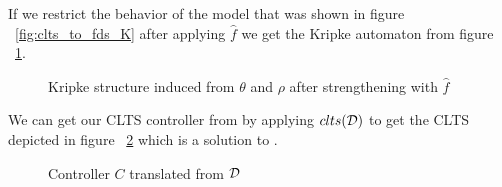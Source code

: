 If we restrict the behavior of the model that was shown in figure ~\ref{fig:clts_to_fds_K} after applying $\hat{f}$ we get the Kripke automaton from figure  ~\ref{fig:clts_to_fds_F}.

\begin{figure}[bt]
	\centering
	\caption{Kripke structure induced from $\theta$ and $\rho$ after strengthening with $\hat{f}$}
	\label{fig:clts_to_fds_F}
\end{figure}

We can get our CLTS controller from \fdsD by applying $clts(\mathcal{D})$ to get the CLTS depicted in figure ~\ref{fig:clts_to_fds_C} which is a solution to \controlProblem.

\begin{figure}[H]
	\centering
	\caption{Controller $C$ translated from $\mathcal{D}$}
	\label{fig:clts_to_fds_C}
\end{figure}